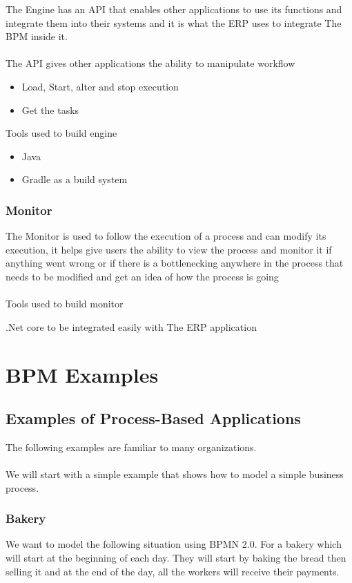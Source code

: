 The Engine has an API that enables other applications to use its functions and integrate them into their
systems and it is what the ERP uses to integrate The BPM inside it.\\\\

The API gives other applications the ability to manipulate workflow
\begin{itemize}
    \item Load, Start, alter and stop execution
    \item Get the tasks
\end{itemize}

Tools used to build engine
\begin{itemize}
    \item Java
    \item Gradle as a build system
\end{itemize}


\subsection{Monitor}

The Monitor is used to follow the execution of a process and can modify its execution, it helps give
users the ability to view the process and monitor it if anything went wrong or if there is a
bottlenecking anywhere in the process that needs to be modified and get an idea of how the process is
going\\\\
Tools used to build monitor
\begin{adjustwidth}{2cm}{}
    .Net core to be integrated easily with The ERP application\\
\end{adjustwidth}

\chapter{BPM Examples}

\section{Examples of Process-Based Applications}
The following examples are familiar to many organizations.\\\\
We will start with a simple example that shows how to model a simple business process.

\subsection{Bakery}
We want to model the following situation using BPMN 2.0. For a bakery which will start at the
beginning of each day. They will start by baking the bread then selling it and at the end of the day, all
the workers will receive their payments.

